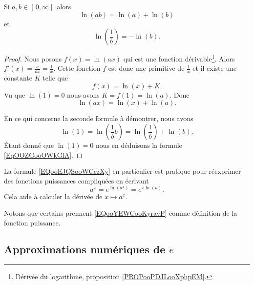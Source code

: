 \begin{lemma}   \label{LemPEYJooEZlueU}
	Si \( a,b\in\mathopen] 0 , \infty \mathclose[\) alors
	\begin{equation}
		\ln(ab)=\ln(a)+\ln(b)
	\end{equation}
	et
	\begin{equation}    \label{EqOOZGooOWkGlA}
		\ln\left( \frac{1}{ b } \right)=-\ln(b).
	\end{equation}
\end{lemma}

\begin{proof}
	Nous posons \( f(x)=\ln(ax)\) qui est une fonction dérivable\footnote{Dérivée du logarithme, proposition \ref{PROPooPDJLooXphpEM}.}. Alors \( f'(x)=\frac{ a }{ ax }=\frac{1}{ x }\). Cette fonction \( f\) est donc une primitive de \( \frac{1}{ x }\) et il existe une constante \( K\) telle que
	\begin{equation}
		f(x)=\ln(x)+K.
	\end{equation}
	Vu que \( \ln(1)=0\) nous avons \( K=f(1)= \ln(a)\). Donc
	\begin{equation}
		\ln(ax)=\ln(x)+\ln(a).
	\end{equation}

	En ce qui concerne la seconde formule à démontrer, nous avons
	\begin{equation}
		\ln(1)=\ln\left( \frac{1}{ b }b \right)=\ln\left( \frac{1}{ b } \right)+\ln(b).
	\end{equation}
	Étant donné que \( \ln(1)=0\) nous en déduisons la formule \eqref{EqOOZGooOWkGlA}.
\end{proof}

\begin{normaltext}
	La formule \eqref{EQooEJQSooWCczXy} en particulier est pratique pour réexprimer des fonctions puissances compliquées en écrivant
	\begin{equation}        \label{EQooYEWCooKyravP}
		a^x= e^{\ln(a^x)}= e^{x\ln(a)}.
	\end{equation}
	Cela aide à calculer la dérivée de \( x\mapsto a^x\).

	Notons que certains prennent \eqref{EQooYEWCooKyravP} comme définition de la fonction puissance.
\end{normaltext}

\subsection{Approximations numériques de \texorpdfstring{\(  e\)}{e}}

